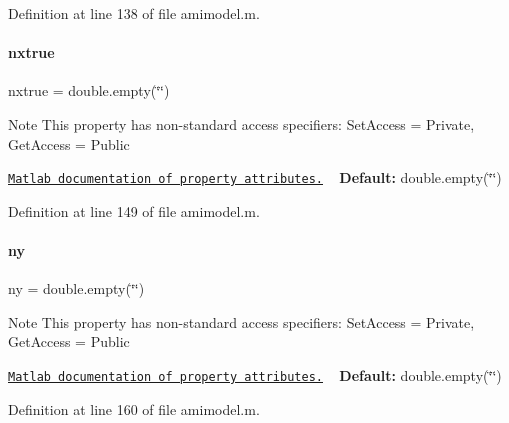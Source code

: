 Definition at line 138 of file amimodel.\+m.

\mbox{\label{classamimodel_a49c476de14a021114feb8c95da04952a}} 
\paragraph{\texorpdfstring{nxtrue}{nxtrue}}
{\footnotesize\ttfamily nxtrue = double.\+empty(\char`\"{}\char`\"{})}

\begin{DoxyNote}{Note}
This property has non-\/standard access specifiers\+: {\ttfamily Set\+Access = Private, Get\+Access = Public} 

\href{http://www.mathworks.com/help/matlab/matlab_oop/property-attributes.html}{\tt Matlab documentation of property attributes.} ~\newline
{\bfseries Default\+:} double.\+empty(\char`\"{}\char`\"{}) 
\end{DoxyNote}


Definition at line 149 of file amimodel.\+m.

\mbox{\label{classamimodel_a289ca425eb368f1d582b6be2be0d3dfc}} 
\paragraph{\texorpdfstring{ny}{ny}}
{\footnotesize\ttfamily ny = double.\+empty(\char`\"{}\char`\"{})}

\begin{DoxyNote}{Note}
This property has non-\/standard access specifiers\+: {\ttfamily Set\+Access = Private, Get\+Access = Public} 

\href{http://www.mathworks.com/help/matlab/matlab_oop/property-attributes.html}{\tt Matlab documentation of property attributes.} ~\newline
{\bfseries Default\+:} double.\+empty(\char`\"{}\char`\"{}) 
\end{DoxyNote}


Definition at line 160 of file amimodel.\+m.

\mbox{\label{classamimodel_ac91d7b36031ec122abc9f739692b02e8}} 
